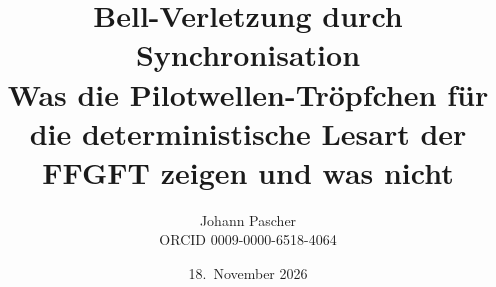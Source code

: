 \documentclass[11pt,a4paper]{report}
\title{Bell-Verletzung durch Synchronisation\\[0.5em]
  \large Was die Pilotwellen-Tröpfchen für die deterministische Lesart der FFGFT zeigen und was nicht}
\date{18.~November 2026}
\author{Johann Pascher\\\small ORCID 0009-0000-6518-4064}
\begin{document}
\renewcommand{\thechapter}{}
\renewcommand{\thesection}{\arabic{section}}
\maketitle
\tableofcontents

\end{document}
